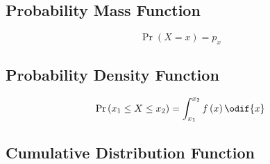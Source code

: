 \documentclass{article}
\begin{document}
\begin{multicols}{3}
    \subsection{Probability Mass Function}
    \begin{equation*}
        \Pr{\left( X = x \right)} = p_x
    \end{equation*}
    \subsection{Probability Density Function}
    \begin{equation*}
        \Pr{\left( x_1 \leq X \leq x_2 \right)} = \int_{x_1}^{x_2} f\left( x \right) \odif{x}
    \end{equation*}
    \subsection{Cumulative Distribution Function}


\end{multicols}
\end{document}
